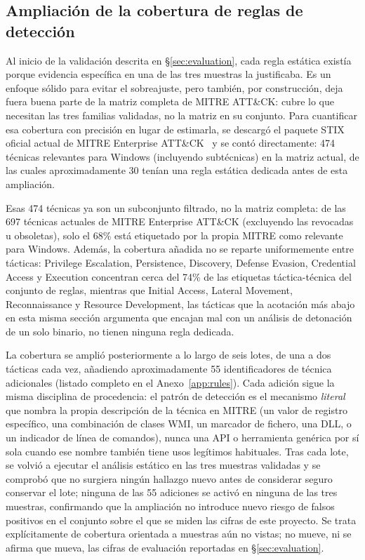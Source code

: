 \subsection{Ampliaci\'on de la cobertura de reglas de detecci\'on}
\label{sec:coverage}

Al inicio de la validaci\'on descrita en \S\ref{sec:evaluation}, cada
regla est\'atica exist\'ia porque evidencia espec\'ifica en una de las
tres muestras la justificaba. Es un enfoque s\'olido para evitar el
sobreajuste, pero tambi\'en, por construcci\'on, deja fuera buena parte
de la matriz completa de MITRE ATT\&CK: cubre lo que necesitan las
tres familias validadas, no la matriz en su conjunto. Para
cuantificar esa cobertura con precisi\'on en lugar de estimarla, se descarg\'o el
paquete STIX oficial actual de MITRE Enterprise
ATT\&CK~\cite{mitre-attack-stix} y se cont\'o directamente: 474
t\'ecnicas relevantes para Windows (incluyendo subt\'ecnicas) en la
matriz actual, de las cuales aproximadamente 30 ten\'ian una regla
est\'atica dedicada antes de esta ampliaci\'on.

Esas 474 t\'ecnicas ya son un subconjunto filtrado, no la matriz
completa: de las 697 t\'ecnicas actuales de MITRE Enterprise ATT\&CK
(excluyendo las revocadas u obsoletas), solo el 68\% est\'a etiquetado
por la propia MITRE como relevante para Windows. Adem\'as, la cobertura
a\~nadida no se reparte uniformemente entre t\'acticas: Privilege
Escalation, Persistence, Discovery, Defense Evasion, Credential Access
y Execution concentran cerca del 74\% de las etiquetas t\'actica-t\'ecnica
del conjunto de reglas, mientras que Initial Access, Lateral Movement,
Reconnaissance y Resource Development, las t\'acticas que la acotaci\'on
m\'as abajo en esta misma secci\'on argumenta que encajan mal con un
an\'alisis de detonaci\'on de un solo binario, no tienen ninguna regla
dedicada.

La cobertura se ampli\'o posteriormente a lo largo de seis lotes, de
una a dos t\'acticas cada vez, a\~nadiendo aproximadamente 55
identificadores de t\'ecnica adicionales (listado completo en el
Anexo~\ref{app:rules}). Cada adici\'on sigue la misma disciplina de
procedencia: el patr\'on de detecci\'on es el mecanismo \emph{literal}
que nombra la propia descripci\'on de la t\'ecnica en MITRE (un valor
de registro espec\'ifico, una combinaci\'on de clases WMI, un marcador
de fichero, una DLL, o un indicador de l\'inea de comandos), nunca una
API o herramienta gen\'erica por s\'i sola cuando ese nombre tambi\'en
tiene usos leg\'itimos habituales. Tras cada lote, se volvi\'o a
ejecutar el an\'alisis est\'atico en las tres muestras validadas y se
comprob\'o que no surgiera ning\'un hallazgo nuevo antes de considerar
seguro conservar el lote; ninguna de las 55 adiciones se activ\'o en
ninguna de las tres muestras, confirmando que la ampliaci\'on no
introduce nuevo riesgo de falsos positivos en el conjunto sobre el que
se miden las cifras de este proyecto. Se trata expl\'icitamente de
cobertura orientada a muestras a\'un no vistas; no mueve, ni se afirma
que mueva, las cifras de evaluaci\'on reportadas en
\S\ref{sec:evaluation}.

